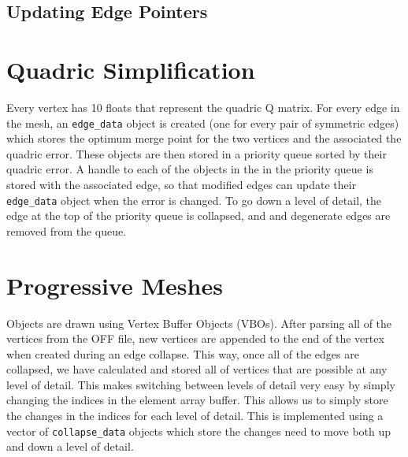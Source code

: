 \documentclass[11pt]{article}
\begin{document}
\subsection{Updating Edge Pointers}

\section{Quadric Simplification}

Every vertex has 10 floats that represent the quadric Q matrix. For every edge
in the mesh, an \verb`edge_data` object is created (one for every pair of symmetric
edges) which stores the optimum merge point for the two vertices and the
associated the quadric error. These objects are then stored in a priority queue
sorted by their quadric error. A handle to each of the objects in the in the
priority queue is stored with the associated edge, so that modified edges can
update their \verb`edge_data` object when the error is changed. To go down a level
of detail, the edge at the top of the priority queue is collapsed, and and
degenerate edges are removed from the queue.

\section{Progressive Meshes}

Objects are drawn using Vertex Buffer Objects (VBOs). After parsing all of the
vertices from the OFF file, new vertices are appended to the end of the vertex
when created during an edge collapse. This way, once all of the edges are
collapsed, we have calculated and stored all of vertices that are possible at
any level of detail. This makes switching between levels of detail very easy by
simply changing the indices in the element array buffer. This allows us to
simply store the changes in the indices for each level of detail. This is
implemented using a vector of \verb`collapse_data` objects which store the changes
need to move both up and down a level of detail.
\end{document}
